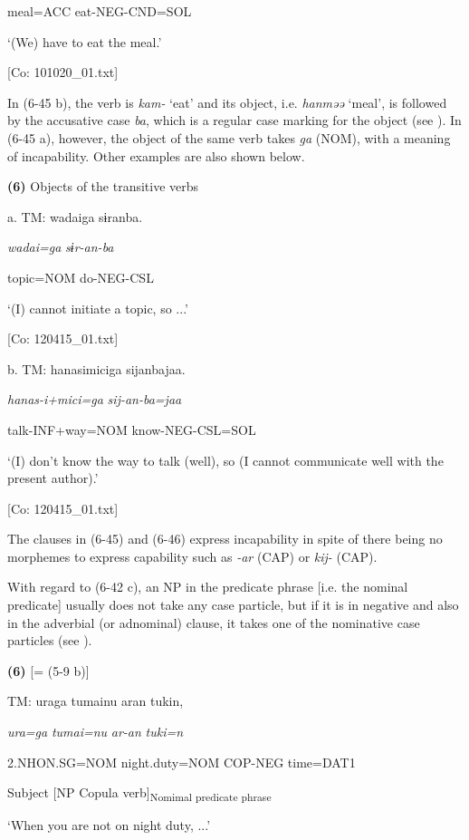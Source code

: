       meal=ACC  eat-NEG-CND=SOL

      ‘(We) have to eat the meal.’

      [Co: 101020\_01.txt]

In (6-45 b), the verb is \textit{kam-} ‘eat’ and its object, i.e. \textit{hanməə} ‘meal’, is followed by the accusative case \textit{ba}, which is a regular case marking for the object (see ). In (6-45 a), however, the object of the same verb takes \textit{ga} (NOM), with a meaning of incapability. Other examples are also shown below.

\textbf{(6)}  Objects of the transitive verbs

  a.  TM:  {\textbar}wadai{\textbar}ga  sɨranba.

      \textit{wadai=ga}  \textit{sɨr-an-ba}

      topic=NOM  do-NEG-CSL

      ‘(I) cannot initiate a topic, so ...’

      [Co: 120415\_01.txt]

  b.  TM:  hanasimiciga  sijanbajaa.

      \textit{hanas-i+mici=ga}  \textit{sij-an-ba=jaa}

      talk-INF+way=NOM  know-NEG-CSL=SOL

      ‘(I) don’t know the way to talk (well), so (I cannot communicate well with the present author).’

      [Co: 120415\_01.txt]

The clauses in (6-45) and (6-46) express incapability in spite of there being no morphemes to express capability such as \textit{{}-ar} (CAP) or \textit{kij-} (CAP).

  With regard to (6-42 c), an NP in the predicate phrase [i.e. the nominal predicate] usually does not take any case particle, but if it is in negative and also in the adverbial (or adnominal) clause, it takes one of the nominative case particles (see ).

\textbf{(6)}  [= (5-9 b)]

  TM:  uraga  tumainu  aran  tukin,

    \textit{ura=ga}  \textit{tumai=nu}  \textit{ar-an}  \textit{tuki=n}

    2.NHON.SG=NOM  night.duty=NOM  COP-NEG  time=DAT1

    Subject  [NP  Copula verb]\textsubscript{Nomimal predicate phrase}  

    ‘When you are not on night duty, ...’

